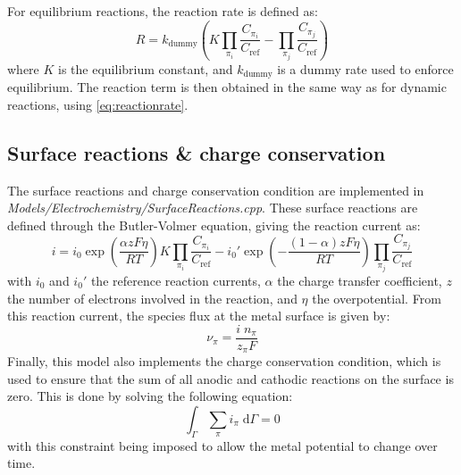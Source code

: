 \documentclass[3p]{elsarticle} %
\begin{document}
For equilibrium reactions, the reaction rate is defined as:
\begin{equation}
	R = k_\text{dummy} \left(K\prod_{\pi_i} \frac{C_{\pi_i}}{C_\text{ref}} - \prod_{\pi_j} \frac{C_{\pi_j}}{C_\text{ref}}\right) \label{eq:equilibrium}
\end{equation}
where $K$ is the equilibrium constant, and $k_\text{dummy}$ is a dummy rate used to enforce equilibrium. The reaction term is then obtained in the same way as for dynamic reactions, using \cref{eq:reactionrate}.

\subsection{Surface reactions \& charge conservation}
The surface reactions and charge conservation condition are implemented in \textit{Models/Electrochemistry/SurfaceReactions.cpp}. These surface reactions are defined through the Butler-Volmer equation, giving the reaction current as:
\begin{equation}
	i = i_0 \exp\left(\frac{\alpha z F \eta}{RT}\right)K\prod_{\pi_i} \frac{C_{\pi_i}}{C_\text{ref}} - i_0' \exp\left(-\frac{(1-\alpha) z F \eta}{RT}\right)\prod_{\pi_j} \frac{C_{\pi_j}}{C_\text{ref}}  \label{eq:ButlerVolmer}
\end{equation}
with $i_0$ and $i_0'$ the reference reaction currents, $\alpha$ the charge transfer coefficient, $z$ the number of electrons involved in the reaction, and $\eta$ the overpotential. From this reaction current, the species flux at the metal surface is given by:
\begin{equation}
	\nu_\pi = \frac{i\;n_\pi}{z_\pi F} \label{eq:flux}
\end{equation}
Finally, this model also implements the charge conservation condition, which is used to ensure that the sum of all anodic and cathodic reactions on the surface is zero. This is done by solving the following equation:
\begin{equation}
	\int_\Gamma \sum_\pi i_\pi \;\text{d}\Gamma = 0 \label{eq:chargeconservation}
\end{equation}
with this constraint being imposed to allow the metal potential to change over time. 
\end{document}

